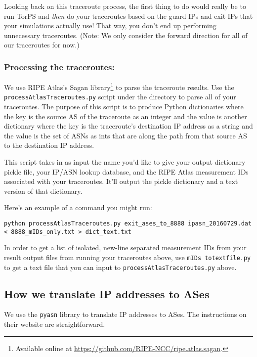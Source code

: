 \documentclass{article}
\begin{document}
\begin{itemize}
\end{itemize}

Looking back on this traceroute process, the first thing to do 
would really be to run TorPS and \emph{then}
do your traceroutes based on the guard IPs and exit IPs that your simulations 
actually use! That way, you don't end up performing unnecessary traceroutes. 
(Note: We only consider the forward direction for all of our 
traceroutes for now.)

\subsubsection{Processing the traceroutes:}
We use RIPE Atlas's Sagan library\footnote{Available online at
\url{https://github.com/RIPE-NCC/ripe.atlas.sagan}.} to parse the traceroute results. Use the 
{\tt processAtlasTraceroutes.py} script under the  directory 
to parse all of your traceroutes. The purpose of this script is to produce 
Python dictionaries where the key is the source AS of the traceroute as an 
integer and the value is another dictionary where the key is the traceroute's 
destination IP address as a string and the value is the set of ASNs as ints that 
are along the path from that source AS to the destination IP address. 

This script takes in as input the name 
you'd like to give your output dictionary pickle file, your IP/ASN lookup database, 
and the RIPE Atlas measurement IDs associated with your traceroutes. It'll output 
the pickle dictionary and a text version of that dictionary.

Here's an example of a command you might run:
\begin{lstlisting}
python processAtlasTraceroutes.py exit_ases_to_8888 ipasn_20160729.dat < 8888_mIDs_only.txt > dict_text.txt
\end{lstlisting}

In order to get a list of isolated, new-line separated measurement IDs from your result 
output files from running your traceroutes above, use {\tt mIDs\textunderscore 
to\textunderscore text\textunderscore file.py} to get a text file that you can 
input to {\tt processAtlasTraceroutes.py} above.

\subsection{How we translate IP addresses to ASes}
We use the {\tt pyasn} library to translate IP addresses to ASes. The instructions 
on their website are straightforward.
\end{document}
